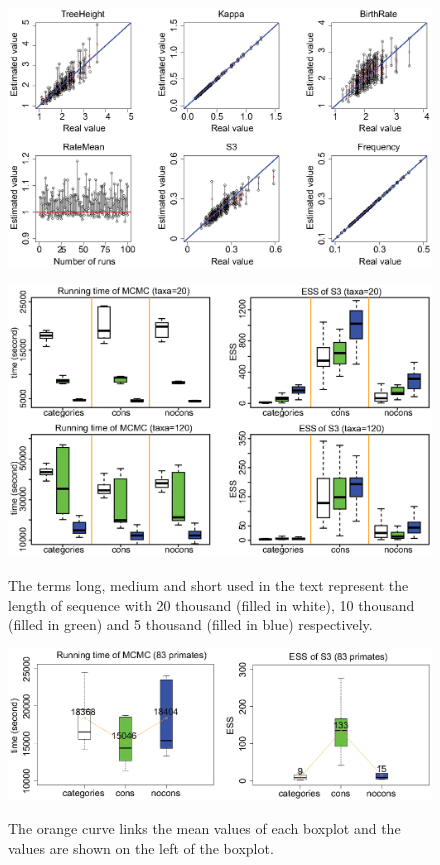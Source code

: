 \documentclass{bmcart}
\begin{document}
\begin{backmatter}
\begin{figure}[h!]
\includegraphics[width=12cm]{Fig13-largetree.eps}\\
\caption{
             }
\label{LargeTree}
\end{figure}

\begin{figure}[h!]
\includegraphics[width=12cm]{Fig14-efficiency.eps}\\
\caption{
             The terms long, medium and short used in the text represent the length of sequence with 20 thousand (filled in white), 10 thousand (filled in green) and 5 thousand (filled in blue) respectively.}
\label{eff_comp}
\end{figure}

\begin{figure}[h!]
\includegraphics[width=12cm]{Fig15-primates.eps}\\
\caption{
             The orange curve links the mean values of each boxplot and the values are shown on the left of the boxplot.}
\label{eff_comp2}
\end{figure}


\end{backmatter}
\end{document}
